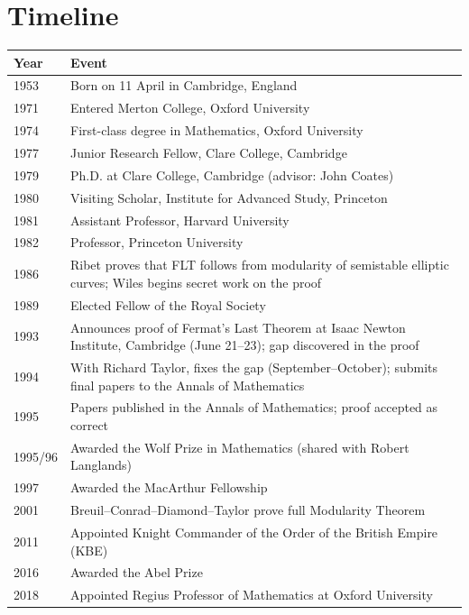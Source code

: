 \section*{Timeline}
\begin{tabularx}{\linewidth}{|p{1.5cm}|>{\raggedright\arraybackslash}X|}
\hline
\textbf{Year} & \textbf{Event} \\ \hline
1953 & Born on 11 April in Cambridge, England \\ \hline
1971 & Entered Merton College, Oxford University \\ \hline
1974 & First-class degree in Mathematics, Oxford University \\ \hline
1977 & Junior Research Fellow, Clare College, Cambridge \\ \hline
1979 & Ph.D. at Clare College, Cambridge (advisor: John Coates) \\ \hline
1980 & Visiting Scholar, Institute for Advanced Study, Princeton \\ \hline
1981 & Assistant Professor, Harvard University \\ \hline
1982 & Professor, Princeton University \\ \hline
1986 & Ribet proves that FLT follows from modularity of semistable elliptic curves; Wiles begins secret work on the proof \\ \hline
1989 & Elected Fellow of the Royal Society \\ \hline
1993 & Announces proof of Fermat's Last Theorem at Isaac Newton Institute, Cambridge (June 21--23); gap discovered in the proof \\ \hline
1994 & With Richard Taylor, fixes the gap (September--October); submits final papers to the Annals of Mathematics \\ \hline
1995 & Papers published in the Annals of Mathematics; proof accepted as correct \\ \hline
1995/96 & Awarded the Wolf Prize in Mathematics (shared with Robert Langlands) \\ \hline
1997 & Awarded the MacArthur Fellowship \\ \hline
2001 & Breuil--Conrad--Diamond--Taylor prove full Modularity Theorem \\ \hline
2011 & Appointed Knight Commander of the Order of the British Empire (KBE) \\ \hline
2016 & Awarded the Abel Prize \\ \hline
2018 & Appointed Regius Professor of Mathematics at Oxford University \\ \hline
\end{tabularx}

